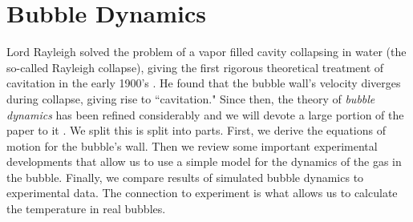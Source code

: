 \documentclass[11pt,prb,aps,nofootinbib,superscriptaddress,floatfix]{revtex4-2}
\begin{document}

\section{Bubble Dynamics}

 
Lord Rayleigh solved the problem of a vapor filled cavity collapsing in water (the so-called Rayleigh collapse), giving the first rigorous theoretical treatment of cavitation in the early 1900's \cite{rayleigh1917pressure,plesset1977bubble}. He found that the bubble wall's velocity diverges during collapse, giving rise to ``cavitation." Since then, the theory of \emph{bubble dynamics} has been refined considerably and we will devote a large portion of the paper to it \cite{prosperetti1999old,plesset1977bubble,plesset1977bubble,brenner2002single,lofstedt1995sonoluminescing,barber1992resolving}. We split this is split into parts. First, we derive the equations of motion for the bubble's wall. Then we review some important experimental developments that allow us to use a simple model for the dynamics of the gas in the bubble. Finally, we compare results of simulated bubble dynamics to experimental data. The connection to experiment is what allows us to calculate the temperature in real bubbles.
\end{document}
